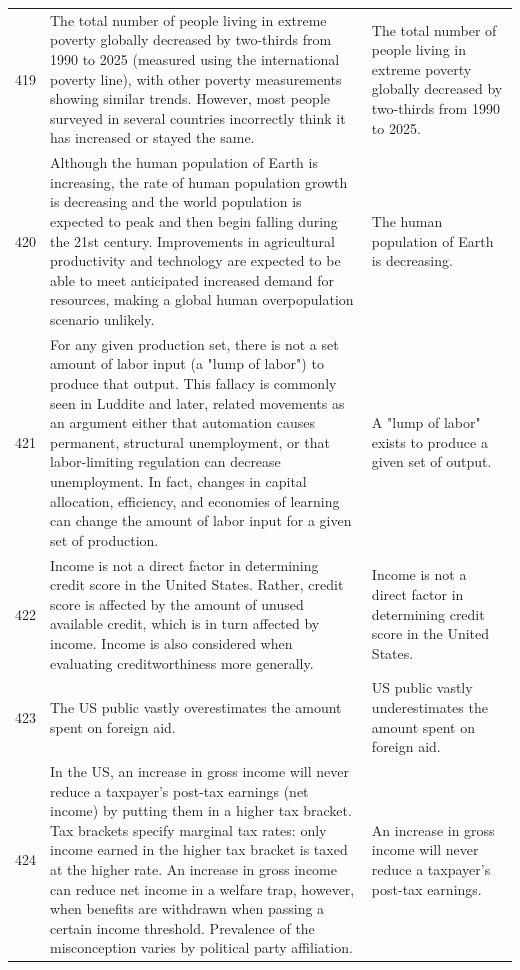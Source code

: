 \begin{tabular}{c|p{}|p{}}
419 & The total number of people living in extreme poverty globally decreased by two-thirds from 1990 to 2025 (measured using the international poverty line), with other poverty measurements showing similar trends. However, most people surveyed in several countries incorrectly think it has increased or stayed the same. & The total number of people living in extreme poverty globally decreased by two-thirds from 1990 to 2025. \\
420 & Although the human population of Earth is increasing, the rate of human population growth is decreasing and the world population is expected to peak and then begin falling during the 21st century. Improvements in agricultural productivity and technology are expected to be able to meet anticipated increased demand for resources, making a global human overpopulation scenario unlikely. & The human population of Earth is decreasing. \\
421 & For any given production set, there is not a set amount of labor input (a "lump of labor") to produce that output. This fallacy is commonly seen in Luddite and later, related movements as an argument either that automation causes permanent, structural unemployment, or that labor-limiting regulation can decrease unemployment. In fact, changes in capital allocation, efficiency, and economies of learning can change the amount of labor input for a given set of production. & A "lump of labor" exists to produce a given set of output. \\
422 & Income is not a direct factor in determining credit score in the United States. Rather, credit score is affected by the amount of unused available credit, which is in turn affected by income. Income is also considered when evaluating creditworthiness more generally. & Income is not a direct factor in determining credit score in the United States. \\
423 & The US public vastly overestimates the amount spent on foreign aid. & US public vastly underestimates the amount spent on foreign aid. \\
424 & In the US, an increase in gross income will never reduce a taxpayer's post-tax earnings (net income) by putting them in a higher tax bracket. Tax brackets specify marginal tax rates: only income earned in the higher tax bracket is taxed at the higher rate. An increase in gross income can reduce net income in a welfare trap, however, when benefits are withdrawn when passing a certain income threshold. Prevalence of the misconception varies by political party affiliation. & An increase in gross income will never reduce a taxpayer's post-tax earnings. \\

\end{tabular}
